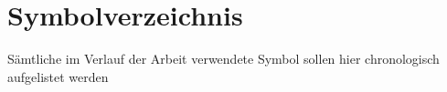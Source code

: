 
\chapter*{Symbolverzeichnis}
\label{sec:Symbolverzeichnis}


Sämtliche im Verlauf der Arbeit verwendete Symbol sollen hier chronologisch aufgelistet werden

